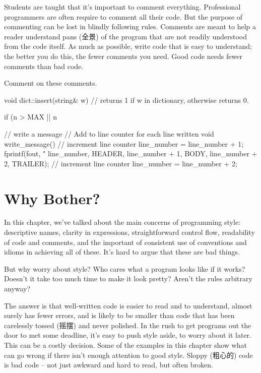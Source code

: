 Students are taught that it's important to comment everything. Professional
programmers are often require to comment all their code. But the purpose of
commenting can be lost in blindly following rules. Comments are meant to
help a reader understand pans (全景) of the program that are not readily
understood from the code itself. As much as possible, write code that is
easy to understand; the better you do this, the fewer comments you need.
Good code needs fewer comments than bad code.

\begin{exercise}
    Comment on these comments.
    \begin{badcode}
        void dict::insert(string& w)
        // returns 1 if w in dictionary, otherwise returns 0.
    \end{badcode}
    \begin{badcode}
        if (n > MAX || n %
    \end{badcode}
    \begin{badcode}
        // write a message
        // Add to line counter for each line written
        void write_message()
        {
            // increment line counter
            line_number = line_number + 1;
            fprintf(fout, "%
                line_number, HEADER,
                line_number + 1, BODY,
                line_number + 2, TRAILER);
            // increment line counter
            line_number = line_number + 2;
        }
    \end{badcode}
\end{exercise}

\section{Why Bother?}
\label{sec:why_bother}
In this chapter, we've talked about the main concerns of programming style:
descriptive names, clarity in expressions, straightforward control flow,
readability of code and comments, and the important of consistent use of
conventions and idioms in achieving all of these. It's hard to argue that
these are bad things.

But why worry about style? Who cares what a program looks like if it works?
Doesn't it take too much time to make it look pretty? Aren't the rules
arbitrary anyway?

The answer is that well-written code is easier to read and to understand,
almost surely has fewer errors, and is likely to be smaller than code that
has been carelessly tossed (摇摆) and never polished. In the rush to get
programs out the door to met some deadline, it's easy to push style aside,
to worry about it later. This can be a costly decision. Some of the
examples in this chapter show what can go wrong if there isn't enough
attention to good style. Sloppy (粗心的) code is bad code -- not just
awkward and hard to read, but often broken.

